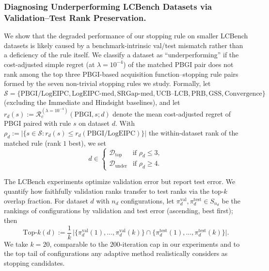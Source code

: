 \subsubsection{Diagnosing Underperforming LCBench Datasets via Validation--Test Rank Preservation.} \label{sec:val_test_diagnostic}
We show that the degraded performance of our stopping rule on smaller LCBench datasets is likely caused by a benchmark-intrinsic val/test mismatch rather than a deficiency of the rule itself. We classify a dataset as ``underperforming'' if the cost-adjusted simple regret (at $\lambda = 10^{-4}$) of the matched PBGI pair does not rank among the top three PBGI-based acquisition function--stopping rule pairs formed by the seven non-trivial stopping rules we study. Formally, let
$\mathcal{S} = \{\text{PBGI/LogEIPC}, \text{LogEIPC-med}, \text{SRGap-med}, \text{UCB--LCB}, \text{PRB}, \text{GSS}, \text{Convergence}\}$
(excluding the Immediate and Hindsight baselines), and let
$r_d(s) := \mathcal{R}_c^{(\lambda=10^{-4})}(\text{PBGI}, s; d)$
denote the mean cost-adjusted regret of PBGI paired with rule $s$ on dataset $d$. With
$\rho_d := \big|\{s \in \mathcal{S} : r_d(s) \le r_d(\text{PBGI/LogEIPC})\}\big|$
the within-dataset rank of the matched rule (rank $1$ best), we set
\begin{equation}
    d \in
    \begin{cases}
        \mathcal{D}_{\mathrm{top}} & \text{if } \rho_d \le 3, \\
        \mathcal{D}_{\mathrm{under}} & \text{if } \rho_d \ge 4.
    \end{cases}
\end{equation}

The LCBench experiments optimize validation error but report test error. We quantify how faithfully validation ranks transfer to test ranks via the top-$k$ overlap fraction. For dataset $d$ with $n_d$ configurations, let $\pi^{\mathrm{val}}_d, \pi^{\mathrm{test}}_d \in S_{n_d}$ be the rankings of configurations by validation and test error (ascending, best first); then
\begin{equation}
    \mathrm{Top}\text{-}k(d) := \frac{1}{k}\,\big|\{\pi^{\mathrm{val}}_d(1), \dots, \pi^{\mathrm{val}}_d(k)\} \cap \{\pi^{\mathrm{test}}_d(1), \dots, \pi^{\mathrm{test}}_d(k)\}\big|.
\end{equation}
We take $k = 20$, comparable to the $200$-iteration cap in our experiments and to the top tail of configurations any adaptive method realistically considers as stopping candidates.

